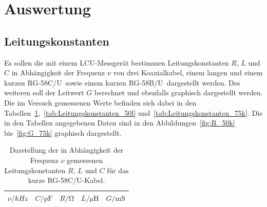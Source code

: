 

\newcommand{\CU}{RG-58C/U}
\newcommand{\BU}{RG-58B/U}


\section{Auswertung}


\subsection{Leitungskonstanten}
\label{sub:leitungskonstanten}

Es sollen die mit einem LCU-Messgerät bestimmen Leitungskonstanten
$R$, $L$ und $C$ in Abhängigkeit der Frequenz $\nu$ von drei Koaxialkabel,
einem langen und einem kurzen \CU\ sowie einem kurzen \BU\ dargestellt werden.
Des weiteren soll der Leitwert $G$ berechnet und ebenfalls graphisch
dargestellt werden.
Die im Versuch gemessenen Werte befinden sich dabei in den
Tabellen~\ref{tab:Leitungskonstanten_50k},~\ref{tab:Leitungskonstanten_50l}
und~\ref{tab:Leitungskonstanten_75k}.
Die in den Tabellen angegebenen Daten sind in den Abbildungen~\ref{fig:R_50k}
bis~\ref{fig:G_75k} graphisch dargestellt.


\begin{table}[htpb]
  \centering
  \begin{tabular}{ccccc}
    \midrule
    \midrule
    $\nu / \si{kHz}$        & $C / \si{\pico\farad}$     & $R / \si{\ohm}$ &
    $L / \si{\micro\henry}$ & $G / \si{\milli\siemens}$ \\
    \midrule
    
    \midrule
    \midrule
  \end{tabular}
  \caption{Darstellung der in Abhängigkeit der Frequenz $\nu$ gemessenen
      Leitungskonstanten $R$, $L$ und $C$ für das kurze \CU-Kabel.}
\label{tab:Leitungskonstanten_50k}
\end{table}

